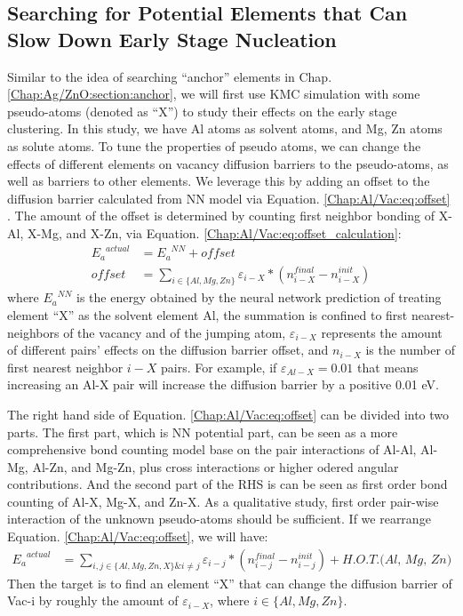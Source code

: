 \subsection{Searching for Potential Elements that Can Slow Down Early Stage Nucleation}
Similar to the idea of searching ``anchor'' elements in Chap. \ref{Chap:Ag/ZnO:section:anchor}, we will first use \ac{KMC} simulation with some pseudo-atoms (denoted as ``X'') to study their effects on the early stage clustering. In this study, we have Al atoms as solvent atoms, and Mg, Zn atoms as solute atoms. To tune the properties of pseudo atoms, we can change the effects of different elements on vacancy diffusion barriers to the pseudo-atoms, as well as barriers to other elements. We leverage this by adding an offset to the diffusion barrier calculated from \ac{NN} model via Equation. \ref{Chap:Al/Vac:eq:offset} . The amount of the offset is determined by counting first neighbor bonding of X-Al, X-Mg, and X-Zn, via Equation. \ref{Chap:Al/Vac:eq:offset_calculation}:
\begin{subequations}
\begin{align}
{E_a}^{actual} & = {E_a}^{NN} + \textit{offset} \label{Chap:Al/Vac:eq:offset} \\
\textit{offset} & = \sum_{i\in\{Al, Mg, Zn\}} \varepsilon_{i-X} * ( n_{i-X}^{final} - n_{i-X}^{init}) \label{Chap:Al/Vac:eq:offset_calculation}
\end{align}
\end{subequations}
where ${E_a}^{NN}$ is the energy obtained by the neural network prediction of treating element ``X'' as the solvent element Al, the summation is confined to first nearest-neighbors of the vacancy and of the jumping atom, $\varepsilon_{i-X}$ represents the amount of different pairs' effects on the diffusion barrier offset, and $n_{i-X}$ is the number of first nearest neighbor $i-X$ pairs. For example, if $\varepsilon_{Al-X} = 0.01$ that means increasing an Al-X pair will increase the diffusion barrier by a positive 0.01 eV.


The right hand side of Equation. \ref{Chap:Al/Vac:eq:offset} can be divided into two parts. The first part, which is \ac{NN} potential part, can be seen as a more comprehensive bond counting model \cite{soisson1996monte} base on the pair interactions of Al-Al, Al-Mg, Al-Zn, and Mg-Zn, plus cross interactions or higher odered angular contributions. And the second part of the RHS is can be seen as first order bond counting of Al-X, Mg-X, and Zn-X. As a qualitative study, first order pair-wise interaction of the unknown pseudo-atoms should be sufficient. If we rearrange Equation. \ref{Chap:Al/Vac:eq:offset}, we will have:
\begin{subequations}
\begin{align}
{E_a}^{actual} & = \sum_{i, j \in\{Al, Mg, Zn, X\} \& i \neq j} \varepsilon_{i-j} * ( n_{i-j}^{final} - n_{i-j}^{init}) + \textit{H.O.T.(Al, Mg, Zn)} \label{Chap:Al/Vac:eq:rearrange}
\end{align}
\end{subequations}
Then the target is to find an element ``X'' that can change the diffusion barrier of Vac-i by roughly the amount of $\varepsilon_{i-X}$, where $i \in \{Al, Mg, Zn\}$.

